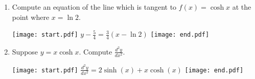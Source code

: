 \documentclass[12pt]{article}
\begin{document}
\begin{enumerate}
\begin{enumerate}
\end{enumerate}

\item Compute an equation of the line which is tangent to $f(x)=\cosh{x}$ at the point where $x=\ln{2}$.

\texttt{[image: start.pdf]}
{$y-\frac{5}{4}=\frac{3}{4}(x-\ln{2})$}
\texttt{[image: end.pdf]}


\item Suppose $y=x\cosh{x}$.  Compute $\frac{d^2y}{dx^2}$.

\texttt{[image: start.pdf]}
{$\frac{d^2y}{dx^2}=2\sinh(x)+x\cosh(x)$}
\texttt{[image: end.pdf]}


\end{enumerate}
\end{document}
